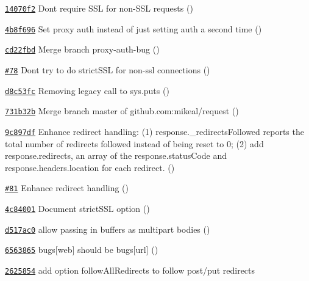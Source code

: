 \begin{DoxyItemize}
\item \href{https://github.com/mikeal/request/commit/14070f269c79cae6ef9e7f7a415867150599bb8e}{\tt 14070f2} Don\textquotesingle{}t require S\+S\+L for non-\/\+S\+S\+L requests ()
\item \href{https://github.com/mikeal/request/commit/4b8f6965e14c6fb704cf16f5bc011e4787cf32b2}{\tt 4b8f696} Set proxy auth instead of just setting auth a second time ()
\item \href{https://github.com/mikeal/request/commit/cd22fbdb00b90c5c75187ecf41373cfbb4af5bcd}{\tt cd22fbd} Merge branch \textquotesingle{}proxy-\/auth-\/bug\textquotesingle{} ()
\item \href{https://github.com/mikeal/request/pull/78}{\tt \#78} Don\textquotesingle{}t try to do strict\+S\+S\+L for non-\/ssl connections ()
\item \href{https://github.com/mikeal/request/commit/d8c53fceca3af385753880395c680f6ec3d4d560}{\tt d8c53fc} Removing legacy call to sys.\+puts ()
\item \href{https://github.com/mikeal/request/commit/731b32b654bb217de3466b8d149ce480988bb24b}{\tt 731b32b} Merge branch \textquotesingle{}master\textquotesingle{} of github.\+com\+:mikeal/request ()
\item \href{https://github.com/mikeal/request/commit/9c897dffc7e238f10eb7e14c61978d6821c70f56}{\tt 9c897df} Enhance redirect handling\+: (1) response.\+\_\+redirects\+Followed reports the total number of redirects followed instead of being reset to 0; (2) add response.\+redirects, an array of the response.\+status\+Code and response.\+headers.\+location for each redirect. ()
\item \href{https://github.com/mikeal/request/pull/81}{\tt \#81} Enhance redirect handling ()
\item \href{https://github.com/mikeal/request/commit/4c8400103ec18a0729e29e9ffb17dda65ce02f6d}{\tt 4c84001} Document strict\+S\+S\+L option ()
\item \href{https://github.com/mikeal/request/commit/d517ac03278b3ebd9a46ca9f263bea68d655822b}{\tt d517ac0} allow passing in buffers as multipart bodies ()
\item \href{https://github.com/mikeal/request/commit/6563865b80573ad3c68834a6633aff6d322b59d5}{\tt 6563865} bugs\mbox{[}web\mbox{]} should be bugs\mbox{[}url\mbox{]} ()
\item \href{https://github.com/mikeal/request/commit/262585480c148c56772dfc8386cfc59d5d262ca0}{\tt 2625854} add option follow\+All\+Redirects to follow post/put redirects

\end{DoxyItemize}

